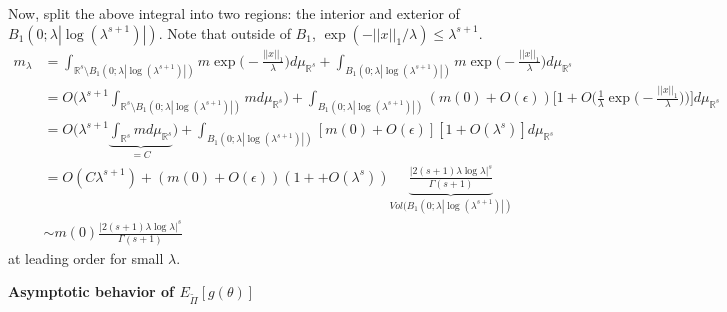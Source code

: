 \documentclass[10pt,fleqn]{article}
\DeclareMathOperator{\1}{\mathbbm{1}}
\begin{document}
{Now, split the above integral into two regions: the interior and exterior of $B_1(0;\lambda|\log(\lambda^{s+1})|)$. Note that outside of $B_1$, $\exp(-||x||_1/\lambda) \le \lambda^{s+1}.$
\begin{align*}
m_\lambda &= \int_{\mathbb{R}^s \setminus B_1(0;\lambda|\log(\lambda^{s+1})|)}m \exp\bigg(-\frac{||x||_1}{\lambda}\bigg)d\mu_{\mathbb{R}^s} + \int_{B_1(0;\lambda|\log(\lambda^{s+1})|)}m \exp\bigg(-\frac{||x||_1}{\lambda}\bigg)d\mu_{\mathbb{R}^s} \\
&=O\bigg( \lambda^{s+1} \int_{\mathbb{R}^s \setminus B_1(0;\lambda|\log(\lambda^{s+1})|)}m d\mu_{\mathbb{R}^s}\bigg) + \int_{B_1(0;\lambda|\log(\lambda^{s+1})|)} (m(0)+O(\epsilon)) \bigg[1+O\bigg(\frac{1}{\lambda}\exp\bigg(-\frac{||x||_1}{\lambda}\bigg)\bigg)\bigg]d\mu_{\mathbb{R}^s}\\
&= O\bigg( \lambda^{s+1} \underbrace{\int_{\mathbb{R}^s}m d\mu_{\mathbb{R}^s}}_{=C}\bigg) + \int_{B_1(0;\lambda|\log(\lambda^{s+1})|)} [m(0) + O(\epsilon)][1+O(\lambda^s)] d\mu_{\mathbb{R}^s}  \\
&= O(C \lambda^{s+1}) + (m(0)+O(\epsilon))(1++ O(\lambda^s)) \underbrace{\frac{|2(s+1)\lambda \log \lambda |^s}{\Gamma(s+1)}}_{Vol(B_1(0;\lambda|\log(\lambda^{s+1})|)}   \\
&\sim m(0) \frac{|2(s+1)\lambda \log \lambda |^s}{\Gamma(s+1)}
\end{align*}
at leading order for small $\lambda$.

\vspace{1cm}
\noindent \textbf{Asymptotic behavior of $E_{\tilde{\Pi}}[g(\theta)]$} \\

}
\end{document}
